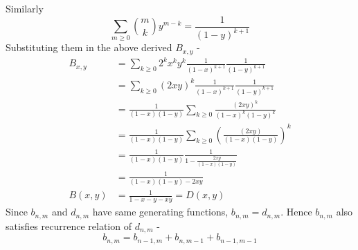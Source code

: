 Similarly 
$$ \sum_{m \geq 0} {m \choose k} y^{m-k} = \frac{1}{(1-y)^{k+1}} $$
Substituting them in the above derived $B_{x, y}$ - 
\begin{align*}
    B_{x, y} &= \sum_{k \geq 0} 2^k x^k y^k \frac{1}{(1-x)^{k+1}} \frac{1}{(1-y)^{k+1}} \\
    &= \sum_{k \geq 0} (2xy)^k \frac{1}{(1-x)^{k+1}} \frac{1}{(1-y)^{k+1}} \\
    &= \frac{1}{(1-x)(1-y)} \sum_{k \geq 0} \frac{(2xy)^k}{(1-x)^k(1-y)^k} \\
    &= \frac{1}{(1-x)(1-y)} \sum_{k \geq 0} (\frac{(2xy)}{(1-x)(1-y)}) ^k \\
    &= \frac{1}{(1-x)(1-y)} \frac{1}{1- \frac{2xy}{(1-x)(1-y)}} \\
    &= \frac{1}{(1-x)(1-y) - 2xy} \\
    B(x, y) &=  \frac{1}{1 - x - y - xy} = D(x, y)
\end{align*}
Since $b_{n, m}$ and $d_{n, m}$ have same generating functions, $b_{n, m} = d_{n, m}$. Hence $b_{n, m}$ also satisfies recurrence relation of $d_{n, m}$ - 
$$ b_{n, m} = b_{n-1, m} + b_{n, m-1} + b_{n-1, m-1}$$



